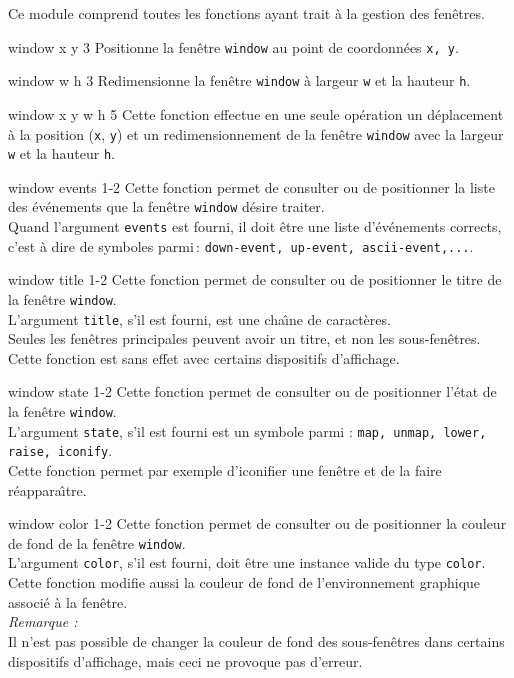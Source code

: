
Ce module comprend toutes les fonctions ayant trait \`{a} la gestion des
fen\^{e}tres.


 {window x y} {3}
Positionne la fen\^{e}tre {\tt window} au point de coordonn\'{e}es {\tt x, y}.


 {window w h} {3}
Redimensionne la fen\^{e}tre {\tt window} \`{a} largeur {\tt w} et la hauteur {\tt h}.


 {window x y w h} {5}
Cette fonction effectue en une seule op\'{e}ration un d\'{e}placement \`{a} la position
({\tt x}, {\tt y}) et un redimensionnement de la fen\^{e}tre {\tt window} avec
la largeur {\tt w} et la hauteur {\tt h}.


 {window events} {1-2}
Cette fonction permet de consulter ou de positionner la liste des \'{e}v\'{e}nements
que la fen\^{e}tre {\tt window} d\'{e}sire traiter.\\
Quand l'argument {\tt events} est fourni, il doit \^{e}tre une liste
d'\'{e}v\'{e}nements corrects, c'est \`{a} dire de symboles
parmi\,: {\tt down-event, up-event, ascii-event,...}.


 {window title} {1-2}
Cette fonction permet de consulter ou de positionner le titre 
de la fen\^{e}tre {\tt window}.\\
L'argument {\tt title}, s'il est fourni, est une cha\^{\i}ne de caract\`{e}res.\\
Seules les fen\^{e}tres principales peuvent avoir un titre, et non les
sous-fen\^{e}tres.
Cette fonction est sans effet avec certains dispositifs d'affichage.


 {window state} {1-2}
Cette fonction permet de consulter ou de positionner l'\'{e}tat de la fen\^{e}tre 
{\tt window}.\\
L'argument {\tt state}, s'il est fourni est un symbole parmi :
{\tt map, unmap, lower, raise, iconify}.\\
Cette fonction permet par exemple d'iconifier une fen\^{e}tre et de la faire
r\'{e}appara\^{\i}tre.


 {window color} {1-2}
Cette fonction permet de consulter ou de positionner la couleur de fond
de la fen\^{e}tre {\tt window}.\\
L'argument {\tt color}, s'il est fourni, doit \^{e}tre une instance valide du type
{\tt color}.\\
Cette fonction modifie aussi la couleur de fond de l'environnement graphique
associ\'{e} \`{a} la fen\^{e}tre.\\
{\em Remarque :}\\
Il n'est pas possible de changer la couleur de fond des sous-fen\^{e}tres dans
certains dispositifs d'affichage, mais ceci ne provoque pas d'erreur.


